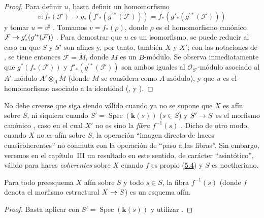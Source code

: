 \documentclass[oneside,10pt]{amsart}
\makeatletter
\newcommand{\ega@arrow}[2]{\mathchoice{#1}{#2}{#2}{#2}}
\renewcommand{\to}{\ega@arrow{\longrightarrow}{\rightarrow}}
\newcommand{\oldpage}[2][]{\marginnote{\normalfont\footnotesize\textbf{#1}~|~#2}\ignorespaces}
\let\EGAOriginalLabel\label
\renewcommand{\label}[1]{\phantomsection\EGAOriginalLabel{#1}}
\makeatother
\begin{document}
\begin{proof}
Para definir $u$, basta definir un homomorfismo
\[
  v:f_*(\mathcal{F})\longrightarrow
  g_*(f'_*(g^{\prime*}(\mathcal{F})))
  =f_*(g'_*(g^{\prime*}(\mathcal{F})))
\]
y tomar $u=v^\sharp$ .
Tomamos $v=f_*(\rho)$, donde $\rho$ es el homomorfismo canónico $\mathcal{F}\to g'_*(g^{\prime*}(\mathcal{F}))$ .
Para demostrar que $u$ es un isomorfismo, se puede reducir al caso en que $S$ y $S'$ son afines y, por tanto, también $X$ y $X'$; con las notaciones de , se tiene entonces $\mathcal{F}=\widetilde{M}$, donde $M$ es un $B$-módulo.
Se observa inmediatamente que $g^*(f_*(\mathcal{F}))$ y $f'_*(g^{\prime*}(\mathcal{F}))$ son ambos iguales al $\mathcal{O}_{S'}$-módulo asociado al $A'$-módulo $A'\otimes_A M$ (donde $M$ se considera como $A$-módulo), y que $u$ es el homomorfismo asociado a la identidad (,  y ).
\end{proof}

\begin{remark}[1.5.3]
\label{II.1.5.3-fr}
No debe creerse que  siga siendo válido cuando ya no se supone que $X$ es afín sobre $S$, ni siquiera cuando $S'=\operatorname{Spec}(\boldsymbol{k}(s))$ ($s\in S$) y $S'\to S$ es el morfismo canónico , caso en el cual $X'$ no es sino la \emph{fibra $f^{-1}(s)$} .
Dicho de otro modo, cuando $X$ no es afín sobre $S$, la operación
\oldpage[II]{13}
``imagen directa de haces cuasicoherentes'' no conmuta con la operación de ``paso a las fibras''.
Sin embargo, veremos en el capítulo~III  un resultado en este sentido, de carácter ``asintótico'', válido para haces \emph{coherentes} sobre $X$ cuando $f$ es propio (\hyperref[II.5.4-fr]{5.4}) y $S$ es noetheriano.
\end{remark}

\begin{corollary}[1.5.4]
\label{II.1.5.4-fr}
Para todo preesquema $X$ afín sobre $S$ y todo $s\in S$, la fibra $f^{-1}(s)$ (donde $f$ denota el morfismo estructural $X\to S$) es un esquema afín.
\end{corollary}

\begin{proof}
Basta aplicar  con $S'=\operatorname{Spec}(\boldsymbol{k}(s))$ y utilizar .
\end{proof}
\end{document}
